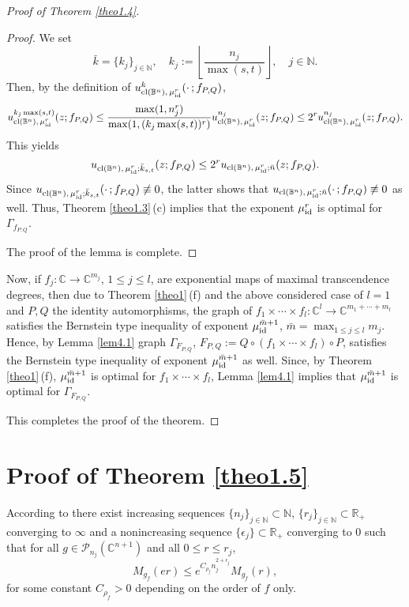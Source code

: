 \documentclass[11pt, oneside]{amsart}
\begin{document}
\begin{proof}[Proof of Theorem \ref{theo1.4}]
\begin{proof}
We set 
\[
\bar k=\{k_j\}_{j\in\mathbb N},\quad k_j:=\left\lfloor\frac{n_j}{\max(s,t)}\right\rfloor,\quad j\in\mathbb N.
\]
Then, by the definition of $u_{{\rm cl}(\mathbb B^n),\,\mu_{{\rm id}}^r}^k(\cdot\, ; f_{P,Q})$,
\[
u_{{\rm cl}(\mathbb B^n),\,\mu_{{\rm id}}^r}^{k_j\max(s,t)}(z ; f_{P,Q})\le \frac{\max(1,n_j^r)}{\max(1, (k_j\max(s,t))^r)} u_{{\rm cl}(\mathbb B^n),\,\mu_{{\rm id}}^r}^{n_j}(z ; f_{P,Q})\le 2^r u_{{\rm cl}(\mathbb B^n),\,\mu_{{\rm id}}^r}^{n_j}(z ; f_{P,Q}).
\]
This yields
\begin{equation}\label{eq4.22}
u_{{\rm cl}(\mathbb B^n),\,\mu_{{\rm id}}^r;\bar {k}_{s,t}} (z ;f_{P,Q})\le 2^r u_{{\rm cl}(\mathbb B^n),\,\mu_{{\rm id}}^r;\bar {n}} (z ;f_{P,Q}).
\end{equation}
Since  $u_{{\rm cl}(\mathbb B^n),\,\mu_{{\rm id}}^r;\bar {k}_{s,t}} (\cdot\, ;f_{P,Q})\not\equiv 0$, the latter shows that  $u_{{\rm cl}(\mathbb B^n),\,\mu_{{\rm id}}^r;\bar {n}} (\cdot\, ;f_{P,Q})\not\equiv 0$ as well. Thus, Theorem \ref{theo1.3}\,(c) implies that the exponent $\mu_{{\rm id}}^r$ is optimal for $\Gamma_{f_{P,Q}}$. 

The proof of the lemma is complete.
\end{proof}
Now, if $f_j:\mathbb C\rightarrow\mathbb C^{m_j}$, $1\le j\le l$, are exponential maps of maximal transcendence degrees, then due to Theorem \ref{theo1}\,(f) and the above considered case of $l=1$ and $P,Q$ the identity automorphisms, the graph of $f_1\times\cdots\times f_l:\mathbb C^l\rightarrow\mathbb C^{m_1+\cdots +m_l}$ satisfies the Bernstein type inequality of exponent $\mu_{{\rm id}}^{\bar m +1}$, $\bar m=\max_{1\le j\le l} m_j$. Hence, by Lemma \ref{lem4.1} graph $\Gamma_{F_{P,Q}}$, $F_{P,Q}:=Q\circ (f_1\times\cdots\times f_l)\circ P$, satisfies the Bernstein type inequality of exponent $\mu_{{\rm id}}^{\bar m +1}$ as well.
Since, by Theorem \ref{theo1}\,(f), $\mu_{{\rm id}}^{\bar m+1}$ is optimal for $f_1\times\cdots\times f_l$, Lemma \ref{lem4.1} implies that $\mu_{{\rm id}}^{\bar m +1}$ is optimal for $\Gamma_{F_{P,Q}}$.

This completes the proof of the theorem.
\end{proof}
\section{Proof of Theorem \ref{theo1.5}}
According to \cite[Th.\,2.5\,(c)]{B} there exist increasing sequences $\{n_j\}_{j\in\mathbb N}\subset\mathbb N$, $\{r_j\}_{j\in\mathbb N}\subset\mathbb R_+$ converging to $\infty$ and a nonincreasing sequence $\{\epsilon_j\}\subset\mathbb R_+$ converging to $0$ such that for all $g\in\mathcal P_{n_j}(\mathbb C^{n+1})$ and all $0\le r\le r_j$,
\begin{equation}\label{eq5.24}
M_{g_f}(er)\le e^{C_{\rho_f} n_j^{2+\epsilon_j}} M_{g_f}(r),
\end{equation} 
for some constant $C_{\rho_f}>0$ depending on the order of  $f$ only. 
\end{document}
